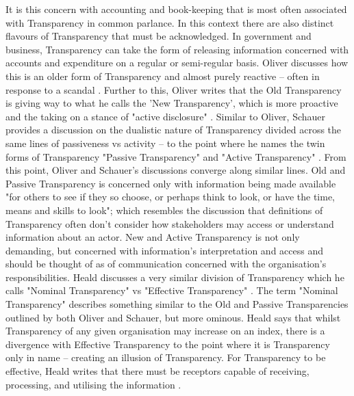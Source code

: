 It is this concern with accounting and book-keeping that is most often associated with Transparency in common parlance. In this context there are also distinct flavours of Transparency that must be acknowledged. In government and business, Transparency can take the form of releasing information concerned with accounts and expenditure on a regular or semi-regular basis. Oliver discusses how this is an older form of Transparency and almost purely reactive -- often in response to a scandal \cite{oliver_what_2004}. Further to this, Oliver writes that the Old Transparency is giving way to what he calls the 'New Transparency', which is more proactive and the taking on a stance of "active disclosure" \cite{oliver_what_2004}. Similar to Oliver, Schauer provides a discussion on the dualistic nature of Transparency divided across the same lines of passiveness vs activity -- to the point where he names the twin forms of Transparency "Passive Transparency" and "Active Transparency" \cite{schauer_transparency_2011}. From this point, Oliver and Schauer's discussions converge along similar lines. Old and Passive Transparency is concerned only with information being made available "for others to see if they so choose, or perhaps think to look, or have the time, means and skills to look"; which resembles the discussion that definitions of Transparency often don't consider how stakeholders may access or understand information about an actor. New and Active Transparency is not only demanding, but concerned with information's interpretation and access and should be thought of as of communication concerned with the organisation's responsibilities. Heald discusses a very similar division of Transparency which he calls "Nominal Transparency" vs "Effective Transparency" \cite{heald_varieties_2006}. The term "Nominal Transparency" describes something similar to the Old and Passive Transparencies outlined by both Oliver and Schauer, but more ominous. Heald says that whilst Transparency of any given organisation may increase on an index, there is a divergence with Effective Transparency to the point where it is Transparency only in name -- creating an illusion of Transparency. For Transparency to be effective, Heald writes that there must be receptors capable of receiving, processing, and utilising the information \cite{heald_varieties_2006}.

